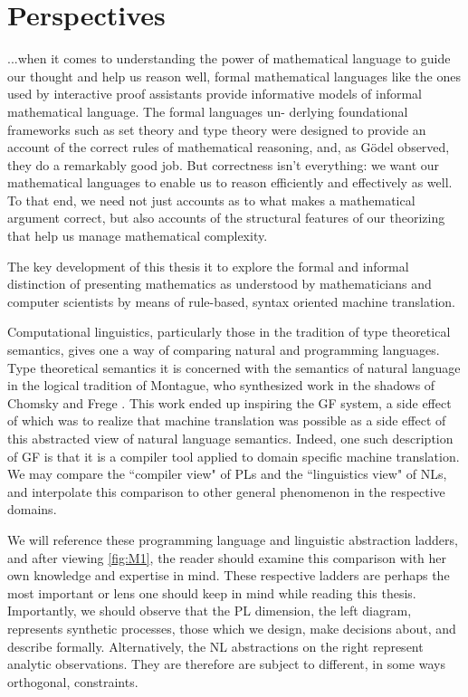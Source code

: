 \section{Perspectives}

\begin{displayquote}

...when it comes to understanding the power of mathematical language to guide our
thought and help us reason well, formal mathematical languages like the ones
used by interactive proof assistants provide informative models of informal
mathematical language. The formal languages un- derlying foundational frameworks
such as set theory and type theory were designed to provide an account of the
correct rules of mathematical reasoning, and, as Gödel observed, they do a
remarkably good job. But correctness isn’t everything: we want our mathematical
languages to enable us to reason efficiently and effectively as well. To that
end, we need not just accounts as to what makes a mathematical argument correct,
but also accounts of the structural features of our theorizing that help us
manage mathematical complexity.\cite{avigad2015mathematics}

\end{displayquote}

The key development of this thesis it to explore the formal and informal
distinction of presenting mathematics as understood by mathematicians and computer
scientists by means of rule-based, syntax oriented machine translation.

Computational linguistics, particularly those in the tradition of type
theoretical semantics\cite{ranta1994type}, gives one a way of comparing natural
and programming languages. Type theoretical semantics it is concerned with the
semantics of natural language in the logical tradition of Montague, who
synthesized work in the shadows of Chomsky \cite{Chomsky57} and Frege
\cite{frege79}. This work ended up inspiring the GF system, a side effect of
which was to realize that machine translation was possible as a side effect of
this abstracted view of natural language semantics. Indeed, one such description
of GF is that it is a compiler tool applied to domain specific machine
translation. We may compare the ``compiler view" of PLs and the ``linguistics view"
of NLs, and interpolate this comparison to other general phenomenon in the
respective domains.

We will reference these programming language and linguistic abstraction ladders,
and after viewing \autoref{fig:M1}, the reader should examine this
comparison with her own knowledge and expertise in mind. These respective
ladders are perhaps the most important or lens one should keep in mind while
reading this thesis. Importantly, we should observe that the PL dimension, the
left diagram, represents synthetic processes, those which we design, make
decisions about, and describe formally. Alternatively, the NL abstractions on
the right represent analytic observations. They are therefore are subject to
different, in some ways orthogonal, constraints.

